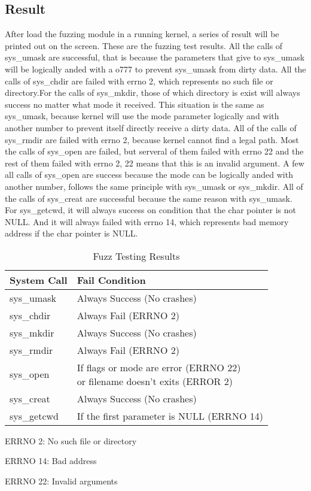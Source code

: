 \documentclass[twoside]{article}
\begin{document}
\begin{multicols}{2}
\section{Result}
After load the fuzzing module in a running kernel, a series of result will be printed out on the screen. These are the fuzzing test results. All the calls of sys\_umask are successful, that is because the parameters that give to sys\_umask will be logically anded with a o777 to prevent sys\_umask from dirty data. All the calls of sys\_chdir are failed with errno 2, which represents no such file or directory.For the calls of sys\_mkdir, those of which directory is exist will always success no matter what mode it received. This situation is the same as sys\_umask, because kernel will use the mode parameter logically and with another number to prevent itself directly receive a dirty data. All of the calls of sys\_rmdir are failed with errno 2, because kernel cannot find a legal path. Most the calls of sys\_open are failed, but serveral of them failed with errno 22 and the rest of them failed with errno 2, 22 means that this is an invalid argument. A few all calls of sys\_open are success because the mode can be logically anded with another number, follows the same principle with sys\_umask or sys\_mkdir. All of the calls of sys\_creat are successful because the same reason with sys\_umask. For sys\_getcwd, it will always success on condition that the char pointer is not NULL. And it will always failed with errno 14, which represents bad memory address if the char pointer is NULL.
\begin{table}[H]
  \begin{threeparttable}
    \caption{Fuzz Testing Results}
    \centering
    \begin{tabular}{ll}
      \toprule
      \cmidrule(r){1-2}
      System Call & Fail Condition \\
      \midrule
      sys\_umask & Always Success (No crashes)\\
      sys\_chdir & Always Fail (ERRNO 2)\\
      sys\_mkdir & Always Success (No crashes)\\
      sys\_rmdir & Always Fail (ERRNO 2)\\
      sys\_open & \parbox[t]{20em}{If flags or mode are error (ERRNO 22)\\or filename doesn't exits (ERROR 2)}\\
      sys\_creat & Always Success (No crashes)\\
      sys\_getcwd & If the first parameter is NULL (ERRNO 14)\\
      \bottomrule
    \end{tabular}
    \begin{tablenotes}
      \small
    \item ERRNO 2: No such file or directory
    \item ERRNO 14: Bad address
    \item ERRNO 22: Invalid arguments
    \end{tablenotes}
  \end{threeparttable}
\end{table}

\end{multicols}
\end{document}
